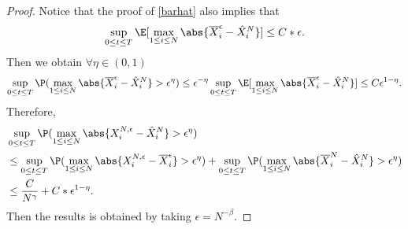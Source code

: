 \begin{proof}
Notice that the proof of \autoref{barhat} also implies that
 \begin{align*}
\sup_{0\leq t\leq T}   \E[\max_{1\leq i\leq N} \abs{\overline{X}_i^{\epsilon}- \hat{X}_i^{N}  }]\le C*\epsilon
 .\end{align*}
Then we obtain $\forall\eta\in (0,1)$
 \begin{align*}
   \sup_{0\leq t\leq T}\P(\max_{1\leq i\leq N} \abs{\overline{X}_i^{\epsilon} - \hat{X}_i^{N}    } > \epsilon ^{\eta} ) \le  \epsilon ^{-\eta} \sup_{0\leq t\leq T} \E[\max_{1\leq i\leq N} \abs{\overline{X}_i^{\epsilon}- \hat{X}_i^{N}  }] \le  C \epsilon ^{1-\eta} 
 .\end{align*}
 Therefore,
 \begin{align*}
   &\sup_{0\leq t\leq T} \P(\max_{1\leq i\leq N}  \abs{X_{i}^{N,\epsilon} - \hat{X}_i^{N} } > \epsilon ^{\eta} )\\
   &\le  \sup_{0 \le  t \le  T} \P(\max_{1\leq i\leq N}  \abs{X_{i}^{N,\epsilon} - \overline{X}_i^{\epsilon} } > \epsilon ^{\eta} ) + \sup_{0 \le  t \le  T} \P(\max_{1\leq i\leq N}  \abs{\overline{X}_{i}^{N} - \hat{X}_i^{N} } > \epsilon ^{\eta}) \\
   &\le \frac{C}{N^{\gamma } } + C*\epsilon ^{1-\eta} 
 .\end{align*}
 Then the results is obtained by taking $\epsilon=N^{-\beta}$.
\end{proof}

